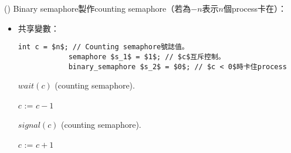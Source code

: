 \begin{theorem}{()} Binary semaphore製作counting semaphore（若為$-n$表示$n$個process卡在）：\begin{itemize}
        \item 共享變數：\begin{lstlisting}[caption={Shared variables of The dining-philosophers problem.}, captionpos=b, mathescape=true]
            int c = $n$; // Counting semaphore號誌值。
            semaphore $s_1$ = $1$; // $c$互斥控制。
            binary_semaphore $s_2$ = $0$; // $c < 0$時卡住process
        \end{lstlisting}
        \begin{algorithm}[H]
            \caption{$wait(c)$ (counting semaphore).}
            \begin{algorithmic}[1]
                    \State {}
                    \State $c$ := $c - 1$
                        \State {}
                        \State {} 
                    \Else
                        \State {}
                    \EndIf
                \EndFunction
            \end{algorithmic}
        \end{algorithm}
        \begin{algorithm}[H]
            \caption{$signal(c)$ (counting semaphore).}
            \begin{algorithmic}[1]
                    \State {}
                    \State $c$ := $c + 1$
                     
                        \State {}
                    \EndIf
                    \State {}
                \EndFunction
            \end{algorithmic}
        \end{algorithm}
    \end{itemize}
\end{theorem}

